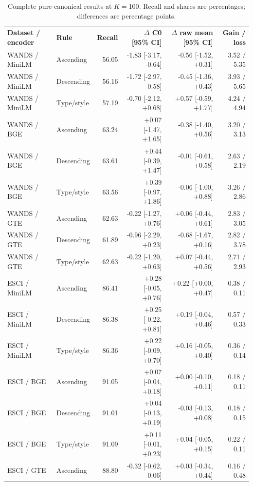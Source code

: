 \begin{table}[t]
\centering
\small
\setlength{\tabcolsep}{4pt}
\caption{Complete pure-canonical results at $K=100$. Recall and shares are percentages; differences are percentage points.}
\label{tab:canonical_intervals100}
\begin{tabular}{llrrrr}
\toprule
Dataset / encoder & Rule & Recall & $\Delta$ C0 [95\% CI] & $\Delta$ raw mean [95\% CI] & Gain / loss \\
\midrule
WANDS / MiniLM & Ascending & 56.05 & -1.83 [-3.17, -0.64] & -0.56 [-1.52, +0.31] & 3.52 / 5.35 \\
WANDS / MiniLM & Descending & 56.16 & -1.72 [-2.97, -0.58] & -0.45 [-1.36, +0.43] & 3.93 / 5.65 \\
WANDS / MiniLM & Type/style & 57.19 & -0.70 [-2.12, +0.68] & +0.57 [-0.59, +1.77] & 4.24 / 4.94 \\
WANDS / BGE & Ascending & 63.24 & +0.07 [-1.47, +1.65] & -0.38 [-1.40, +0.56] & 3.20 / 3.13 \\
WANDS / BGE & Descending & 63.61 & +0.44 [-0.39, +1.47] & -0.01 [-0.61, +0.58] & 2.63 / 2.19 \\
WANDS / BGE & Type/style & 63.56 & +0.39 [-0.97, +1.86] & -0.06 [-1.00, +0.88] & 3.26 / 2.86 \\
WANDS / GTE & Ascending & 62.63 & -0.22 [-1.27, +0.76] & +0.06 [-0.44, +0.61] & 2.83 / 3.05 \\
WANDS / GTE & Descending & 61.89 & -0.96 [-2.29, +0.23] & -0.68 [-1.67, +0.16] & 2.82 / 3.78 \\
WANDS / GTE & Type/style & 62.63 & -0.22 [-1.20, +0.63] & +0.07 [-0.44, +0.56] & 2.71 / 2.93 \\
ESCI / MiniLM & Ascending & 86.41 & +0.28 [-0.05, +0.76] & +0.22 [+0.00, +0.47] & 0.38 / 0.11 \\
ESCI / MiniLM & Descending & 86.38 & +0.25 [-0.22, +0.81] & +0.19 [-0.04, +0.46] & 0.57 / 0.33 \\
ESCI / MiniLM & Type/style & 86.36 & +0.22 [-0.09, +0.70] & +0.16 [-0.05, +0.40] & 0.36 / 0.14 \\
ESCI / BGE & Ascending & 91.05 & +0.07 [-0.04, +0.18] & +0.00 [-0.10, +0.11] & 0.18 / 0.11 \\
ESCI / BGE & Descending & 91.01 & +0.04 [-0.13, +0.19] & -0.03 [-0.13, +0.08] & 0.18 / 0.15 \\
ESCI / BGE & Type/style & 91.09 & +0.11 [-0.01, +0.23] & +0.04 [-0.05, +0.15] & 0.22 / 0.11 \\
ESCI / GTE & Ascending & 88.80 & -0.32 [-0.62, -0.06] & +0.03 [-0.34, +0.44] & 0.16 / 0.48 \\

\end{tabular}
\end{table}
